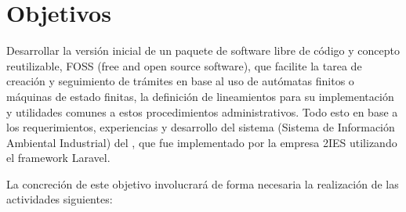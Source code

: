 \section{Objetivos}
Desarrollar la versión inicial de un paquete de software libre de código y
concepto reutilizable, FOSS (free and open source software), que facilite la
tarea de creación y seguimiento de trámites en base al uso de autómatas finitos
o máquinas de estado finitas, la definición de lineamientos para su
implementación y utilidades comunes a estos procedimientos administrativos. Todo
esto en base a los requerimientos, experiencias y desarrollo del sistema
 (Sistema de Información Ambiental Industrial) del , que fue implementado por la empresa
2IES utilizando el framework Laravel.

La concreción de este objetivo involucrará de forma necesaria la realización de
las actividades siguientes:

